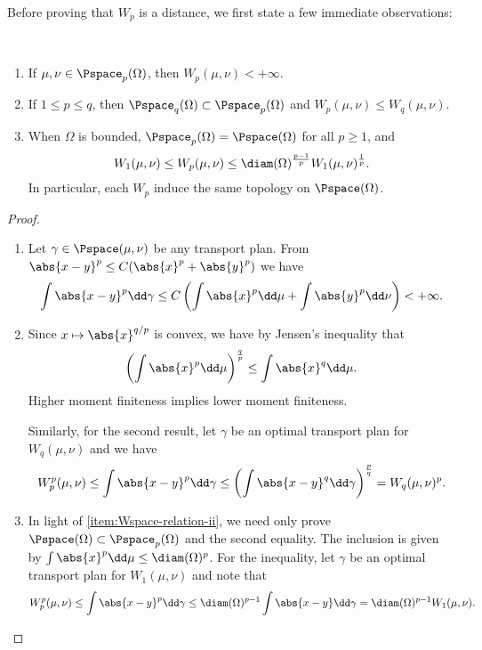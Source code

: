 \documentclass[oneside,reqno,letterpaper]{amsart}
\begin{document}
Before proving that \(W_p\) is a distance, we first state a few immediate observations:
\begin{proposition}\label{prop:Wdist-top-equiv}~
  \begin{enumerate}[label=(\roman*)]
    \item If \(\mu, \nu \in \Pspace_p(\Omega)\), then \(W_p(\mu, \nu) < +\infty\).
    \item\label{item:Wspace-relation-ii} If \(1 \leq p \leq q\), then \(\Pspace_q(\Omega) \subset \Pspace_p(\Omega)\) and \(W_p(\mu, \nu) \leq W_q(\mu, \nu)\).
    \item When \(\Omega\) is bounded, \(\Pspace_p(\Omega) = \Pspace(\Omega)\) for all \(p \geq 1\), and
      \[
        W_1(\mu, \nu) \leq W_p(\mu, \nu) \leq \diam(\Omega)^{\frac{p - 1}{p}} W_1(\mu, \nu)^{\frac{1}{p}}.
      \]
      In particular, each \(W_p\) induce the same topology on \(\Pspace(\Omega)\).
  \end{enumerate}
\end{proposition}
\begin{proof}~
  \begin{enumerate}[label=(\roman*)]
    \item Let \(\gamma \in \Pspace(\mu, \nu)\) be any transport plan.
      From \(\abs{x - y}^p \leq C (\abs{x}^p + \abs{y}^p)\) we have
      \[
        \int \abs{x - y}^p \dd \gamma
        \leq C \left( \int \abs{x}^p \dd \mu + \int \abs{y}^p \dd \nu \right)
        < +\infty.
      \]
      \item Since \(x \mapsto \abs{x}^{q / p}\) is convex, we have by Jensen's inequality that
        \[
          \left( \int \abs{x}^p \dd \mu \right)^{\frac{q}{p}}
          \leq \int \abs{x}^q \dd \mu.
        \]
        Higher moment finiteness implies lower moment finiteness.

        Similarly, for the second result, let \(\gamma\) be an optimal transport plan for \(W_q(\mu, \nu)\) and we have
        \[
          W_p^p(\mu, \nu)
          \leq \int \abs{x - y}^p \dd \gamma
          \leq \left( \int \abs{x - y}^q \dd \gamma \right)^{\frac{p}{q}}
          = W_q(\mu, \nu)^p.
        \]
      \item
        In light of \ref{item:Wspace-relation-ii}, we need only prove \(\Pspace(\Omega) \subset \Pspace_p(\Omega)\) and the second equality.
        The inclusion is given by \(\int \abs{x}^p \dd \mu \leq \diam(\Omega)^p\).
        For the inequality, let \(\gamma\) be an optimal transport plan for \(W_1(\mu, \nu)\) and note that
        \[
          W_p^p(\mu, \nu)
          \leq \int \abs{x - y}^p \dd \gamma
          \leq \diam(\Omega)^{p - 1} \int \abs{x - y} \dd \gamma
          = \diam(\Omega)^{p - 1} W_1(\mu, \nu).
        \]
  \end{enumerate}
\end{proof}
\end{document}
